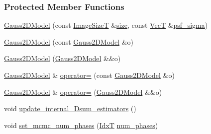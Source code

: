 \subsubsection*{Protected Member Functions}
\begin{DoxyCompactItemize}
\item 
\hyperlink{classmappel_1_1Gauss2DModel_aa2247488bb3d360e323b9819ccef3429}{Gauss2\+D\+Model} (const \hyperlink{classmappel_1_1ImageFormat2DBase_a49cccf61eb2a768a202634d27fcd81d5}{Image\+SizeT} \&\hyperlink{classmappel_1_1ImageFormat2DBase_a3be77d2aa6ec9f3815322732950c2a60}{size}, const \hyperlink{namespacemappel_a2225ad69f358daa3f4f99282a35b9a3a}{VecT} \&\hyperlink{classmappel_1_1Gauss2DModel_acb73f86ea080515e843f47be9502b271}{psf\+\_\+sigma})
\item 
\hyperlink{classmappel_1_1Gauss2DModel_a9077c30d005e11fd0ac6f4345d371ff8}{Gauss2\+D\+Model} (const \hyperlink{classmappel_1_1Gauss2DModel}{Gauss2\+D\+Model} \&o)
\item 
\hyperlink{classmappel_1_1Gauss2DModel_a682dc3475e6bbd26a4dd7a218f648ce3}{Gauss2\+D\+Model} (\hyperlink{classmappel_1_1Gauss2DModel}{Gauss2\+D\+Model} \&\&o)
\item 
\hyperlink{classmappel_1_1Gauss2DModel}{Gauss2\+D\+Model} \& \hyperlink{classmappel_1_1Gauss2DModel_ac71b6bde6695ad5c3b58c366bc48600d}{operator=} (const \hyperlink{classmappel_1_1Gauss2DModel}{Gauss2\+D\+Model} \&o)
\item 
\hyperlink{classmappel_1_1Gauss2DModel}{Gauss2\+D\+Model} \& \hyperlink{classmappel_1_1Gauss2DModel_aea16d80c55d55478bb0e4d1e465d17af}{operator=} (\hyperlink{classmappel_1_1Gauss2DModel}{Gauss2\+D\+Model} \&\&o)
\item 
void \hyperlink{classmappel_1_1Gauss2DModel_a221f765c48f478177f150c08733e9d29}{update\+\_\+internal\+\_\+Dsum\+\_\+estimators} ()
\item 
void \hyperlink{classmappel_1_1MCMCAdaptorBase_ad6c75e327e8732abc2654492f372563a}{set\+\_\+mcmc\+\_\+num\+\_\+phases} (\hyperlink{namespacemappel_ab17ec0f30b61ece292439d7ece81d3a8}{IdxT} \hyperlink{classmappel_1_1MCMCAdaptorBase_a44b90a984ace712584074dc17831fe25}{num\+\_\+phases})
\end{DoxyCompactItemize}
